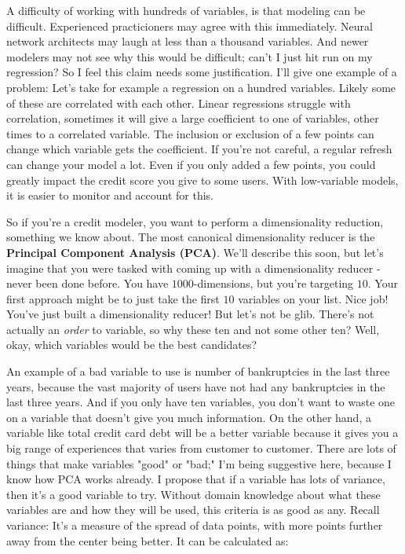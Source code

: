 \documentclass{amsbook}
\begin{document}
A difficulty of working with hundreds of variables, is that modeling can be difficult.  Experienced practicioners may agree with this immediately.  Neural network architects may laugh at less than a thousand variables.  And newer modelers may not see why this would be difficult; can't I just hit run on my regression?  So I feel this claim needs some justification.  I'll give one example of a problem:  Let's take for example a regression on a hundred variables.  Likely some of these are correlated with each other.  Linear regressions struggle with correlation, sometimes it will give a large coefficient to one of variables, other times to a correlated variable.  The inclusion or exclusion of a few points can change which variable gets the coefficient.  If you're not careful, a regular refresh can change your model a lot.  Even if you only added a few points, you could greatly impact the credit score you give to some users.  With low-variable models, it is easier to monitor and account for this.

So if you're a credit modeler, you want to perform a dimensionality reduction, something we know about.  The most canonical dimensionality reducer is the {\bf Principal Component Analysis (PCA)}.  We'll describe this soon, but let's imagine that you were tasked with coming up with a dimensionality reducer - never been done before.  You have $1000$-dimensions, but you're targeting $10$.  Your first approach might be to just take the first $10$ variables on your list.  Nice job!  You've just built a dimensionality reducer!  But let's not be glib.  There's not actually an {\em order} to variable, so why these ten and not some other ten?  Well, okay, which variables would be the best candidates?

An example of a bad variable to use is number of bankruptcies in the last three years, because the vast majority of users have not had any bankruptcies in the last three years.  And if you only have ten variables, you don't want to waste one on a variable that doesn't give you much information.  On the other hand, a variable like total credit card debt will be a better variable because it gives you a big range of experiences that varies from customer to customer.  There are lots of things that make variables "good" or "bad;" I'm being suggestive here, because I know how PCA works already.  I propose that if a variable has lots of variance, then it's a good variable to try.  Without domain knowledge about what these variables are and how they will be used, this criteria is as good as any.  Recall variance:  It's a measure of the spread of data points, with more points further away from the center being better.  It can be calculated as:
\end{document}
